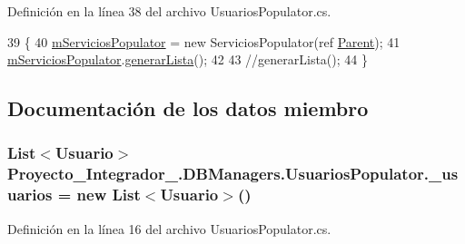 Definición en la línea 38 del archivo Usuarios\-Populator.\-cs.


\begin{DoxyCode}
39             \{
40                 \hyperlink{class_proyecto___integrador__3_1_1_d_b_managers_1_1_usuarios_populator_a38322db59dd24df528d67958f931921e}{mServiciosPopulator} = \textcolor{keyword}{new} ServiciosPopulator(ref 
      \hyperlink{class_proyecto___integrador__3_1_1_d_b_managers_1_1_usuarios_populator_a262c4a0f4d44e86a9030208d6cb6d26a}{Parent});
41                 \hyperlink{class_proyecto___integrador__3_1_1_d_b_managers_1_1_usuarios_populator_a38322db59dd24df528d67958f931921e}{mServiciosPopulator}.\hyperlink{class_proyecto___integrador__3_1_1_d_b_managers_1_1_servicios_populator_a9ac6be7f5ecdbdadd850b3519a985f75}{generarLista}();
42 
43                 \textcolor{comment}{//generarLista();}
44             \}
\end{DoxyCode}


\subsection{Documentación de los datos miembro}
\hypertarget{class_proyecto___integrador__3_1_1_d_b_managers_1_1_usuarios_populator_a4e30b143aa6f019cf45324d6192ea802}{
\subsubsection[{\-\_\-usuarios}]{\setlength{\rightskip}{0pt plus 5cm}List$<${\bf Usuario}$>$ Proyecto\-\_\-\-Integrador\-\_.\-D\-B\-Managers.\-Usuarios\-Populator.\-\_\-usuarios = new List$<${\bf Usuario}$>$()\hspace{0.3cm}{\ttfamily [private]}}}\label{class_proyecto___integrador__3_1_1_d_b_managers_1_1_usuarios_populator_a4e30b143aa6f019cf45324d6192ea802}


Definición en la línea 16 del archivo Usuarios\-Populator.\-cs.

